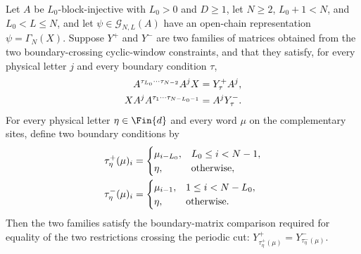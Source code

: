 \begin{lemma}
    \label{thm:wrapped_mirror_witness_agree_chain_ground_space}
    \leanok
    Let $A$ be $L_0$-block-injective with $L_0>0$ and $D\ge1$, let $N\ge2$,
    $L_0+1<N$, and $L_0<L\le N$, and let
    $\psi\in\mathcal G_{N,L}(A)$ have an open-chain representation
    $\psi=\Gamma_N(X)$. Suppose $Y^{+}$ and $Y^{-}$ are two families of
    matrices obtained from the two boundary-crossing cyclic-window constraints,
    and that they satisfy, for every physical letter $j$ and every boundary
    condition $\tau$,
    \begin{align}
        A^{\tau_{L_0}\cdots\tau_{N-2}} A^j X
         & =
        Y^{+}_{\tau} A^j,
        \notag \\
        X A^j A^{\tau_1\cdots\tau_{N-L_0-1}}
         & =
        A^j Y^{-}_{\tau}.
        \notag
    \end{align}
    For every physical letter $\eta\in\Fin{d}$ and every word $\mu$ on the
    complementary sites, define two boundary conditions by
    \begin{align}
        \tau^{+}_{\eta}(\mu)_i
         & =
        \begin{cases}
            \mu_{i-L_0}, & L_0\le i<N-1,     \\
            \eta,        & \text{otherwise},
        \end{cases}
        \notag \\
        \tau^{-}_{\eta}(\mu)_i
         & =
        \begin{cases}
            \mu_{i-1}, & 1\le i<N-L_0,     \\
            \eta,      & \text{otherwise}.
        \end{cases}
        \notag
    \end{align}
    Then the two families satisfy the boundary-matrix comparison required for
    equality of the two restrictions crossing the periodic cut:
    $Y^{+}_{\tau^{+}_{\eta}(\mu)} = Y^{-}_{\tau^{-}_{\eta}(\mu)}$.
\end{lemma}

